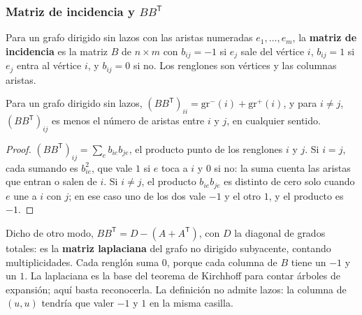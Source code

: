 \documentclass[11pt,letterpaper]{article}
\begin{document}
\subsubsection*{Matriz de incidencia y $BB^{\mathsf{T}}$}

\begin{definicion}
  Para un grafo dirigido sin lazos con las aristas numeradas
  $e_1, \dots, e_m$, la \textbf{matriz de incidencia} es la matriz
  $B$ de $n \times m$ con $b_{ij} = -1$ si $e_j$ sale del vértice $i$,
  $b_{ij} = 1$ si $e_j$ entra al vértice $i$, y $b_{ij} = 0$ si no.
  Los renglones son vértices y las columnas aristas.
\end{definicion}

\begin{proposicion}
  \label{prop:busq-incidencia}
  Para un grafo dirigido sin lazos,
  $(BB^{\mathsf{T}})_{ii} = \text{gr}^{-}(i) + \text{gr}^{+}(i)$, y
  para $i \neq j$, $(BB^{\mathsf{T}})_{ij}$ es menos el número de
  aristas entre $i$ y $j$, en cualquier sentido.
\end{proposicion}

\begin{proof}
  $(BB^{\mathsf{T}})_{ij} = \sum_{e} b_{ie} b_{je}$, el producto punto
  de los renglones $i$ y $j$. Si $i = j$, cada sumando es $b_{ie}^2$,
  que vale $1$ si $e$ toca a $i$ y $0$ si no: la suma cuenta las
  aristas que entran o salen de $i$. Si $i \neq j$, el producto
  $b_{ie} b_{je}$ es distinto de cero solo cuando $e$ une a $i$ con
  $j$; en ese caso uno de los dos vale $-1$ y el otro $1$, y el
  producto es $-1$.
\end{proof}

Dicho de otro modo, $BB^{\mathsf{T}} = D - (A + A^{\mathsf{T}})$, con
$D$ la diagonal de grados totales: es la \textbf{matriz laplaciana} del
grafo no dirigido subyacente, contando multiplicidades. Cada renglón
suma $0$, porque cada columna de $B$ tiene un $-1$ y un $1$. La
laplaciana es la base del teorema de Kirchhoff para contar árboles de
expansión; aquí basta reconocerla. La definición no admite lazos: la
columna de $(u, u)$ tendría que valer $-1$ y $1$ en la misma casilla.
\end{document}
